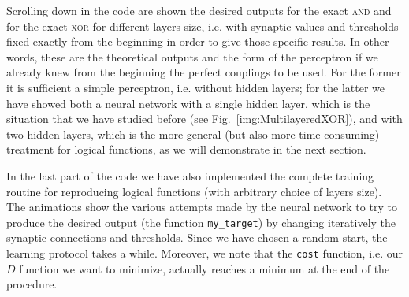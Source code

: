 Scrolling down in the code are shown the desired outputs for the exact \textsc{and} and for the exact \textsc{xor} for different layers size, i.e. with synaptic values and thresholds fixed exactly from the beginning in order to give those specific results. In other words, these are the theoretical outputs and the form of the perceptron if we already knew from the beginning the perfect couplings to be used. For the former it is sufficient a simple perceptron, i.e. without hidden layers; for the latter we have showed both a neural network with a single hidden layer, which is the situation that we have studied before (see Fig.~\ref{img:MultilayeredXOR}), and with two hidden layers, which is the more general (but also more time-consuming) treatment for logical functions, as we will demonstrate in the next section.

In the last part of the code we have also implemented the complete training routine for reproducing logical functions (with arbitrary choice of layers size). The animations show the various attempts made by the neural network to try to produce the desired output (the function \texttt{my\_target}) by changing iteratively the synaptic connections and thresholds. Since we have chosen a random start, the learning protocol takes a while. Moreover, we note that the \texttt{cost} function, i.e. our $D$ function we want to minimize, actually reaches a minimum at the end of the procedure.
